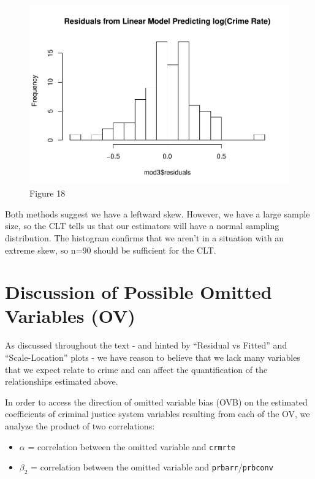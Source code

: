 \documentclass[]{article}
\providecommand{\tightlist}{%
  \setlength{\itemsep}{0pt}\setlength{\parskip}{0pt}}
\begin{document}
\begin{figure}

{\centering \includegraphics{lab_3_final_files/figure-latex/unnamed-chunk-50-1} 

}

\caption{Figure 18}\label{fig:unnamed-chunk-50}
\end{figure}

Both methods suggest we have a leftward skew. However, we have a large
sample size, so the CLT tells us that our estimators will have a normal
sampling distribution. The histogram confirms that we aren't in a
situation with an extreme skew, so n=90 should be sufficient for the
CLT.

\hypertarget{discussion-of-possible-omitted-variables-ov}{%
\section{Discussion of Possible Omitted Variables
(OV)}\label{discussion-of-possible-omitted-variables-ov}}

As discussed throughout the text - and hinted by ``Residual vs Fitted''
and ``Scale-Location'' plots - we have reason to believe that we lack
many variables that we expect relate to crime and can affect the
quantification of the relationships estimated above.

In order to access the direction of omitted variable bias (OVB) on the
estimated coefficients of criminal justice system variables resulting
from each of the OV, we analyze the product of two correlations:

\begin{itemize}
\tightlist
\item
  \(\alpha\) = correlation between the omitted variable and
  \texttt{crmrte}
\item
  \(\beta_2\) = correlation between the omitted variable and
  \texttt{prbarr}/\texttt{prbconv}
\end{itemize}
\end{document}
